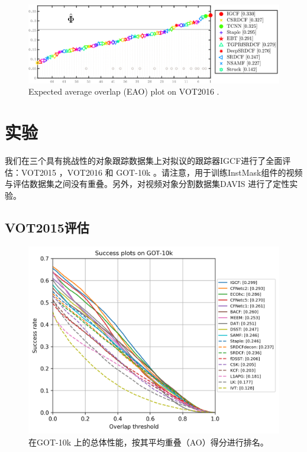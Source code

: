\begin{figure}
    \centering
    \includegraphics[width=1.0\textwidth]{Img/IGCF/vot/eao_rank_vot2016.png}
    \caption{Expected average overlap (EAO) plot on VOT2016 \cite{Kristan2016TheVO}.}
    \label{fig:vot16}
\end{figure}

\section{实验}
我们在三个具有挑战性的对象跟踪数据集上对拟议的跟踪器IGCF进行了全面评估：VOT2015 \cite{Kristan2015TheVO}，VOT2016 \cite{Kristan2016TheVO} 和 GOT-10k \cite{GOT-10k}。请注意，用于训练InstMask组件的视频与评估数据集之间没有重叠。另外，对视频对象分割数据集DAVIS \cite{Perazzi2016}进行了定性实验。
\subsection{VOT2015评估}

\begin{figure}
    \centering
    \includegraphics[width=1.0\textwidth]{Img/IGCF/got10k/success_plot.png}
    \caption{在GOT-10k \cite{GOT-10k}上的总体性能，按其平均重叠（AO）得分进行排名。}
    \label{fig:got10k}
\end{figure}

